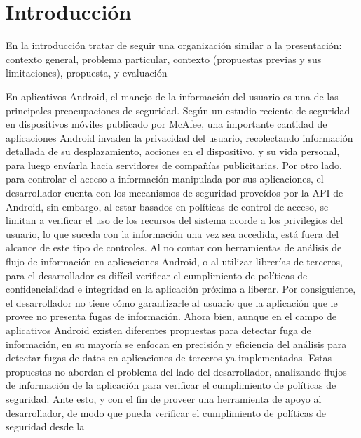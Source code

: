 \label{ch:introduccion}
\chapter{Introducción}
En la introducción tratar de seguir una organización similar a la presentación:
contexto general, problema particular, contexto (propuestas previas y sus
limitaciones), propuesta, y evaluación\newline

En aplicativos Android, el manejo de la información del usuario es una de las
principales preocupaciones de seguridad. Según un estudio reciente de seguridad
en dispositivos móviles publicado por McAfee\cite{McAfeeReport}, una importante
cantidad de aplicaciones Android invaden la privacidad del usuario, recolectando
información detallada de su desplazamiento, acciones en el dispositivo, y su
vida personal, para luego envíarla hacia servidores de compañías publicitarias.\newline 
Por otro lado, para controlar el acceso a información manipulada por sus
aplicaciones, el desarrollador cuenta con los mecanismos de seguridad proveídos
por la API de Android, sin embargo, al estar basados en políticas de control de
acceso, se limitan a verificar el uso de los recursos del sistema acorde a los
privilegios del usuario, lo que suceda con la información una vez sea accedida,
está fuera del alcance de este tipo de controles.\newline 
Al no contar con herramientas
de análisis de flujo de información en aplicaciones Android, o al utilizar
librerías de terceros, para el desarrollador es difícil verificar el
cumplimiento de políticas de confidencialidad e integridad en la aplicación
próxima a liberar. Por consiguiente, el desarrollador no tiene cómo garantizarle
al usuario que la aplicación que le provee no presenta fugas de información.\newline 
Ahora bien, aunque en el campo de aplicativos Android existen diferentes
propuestas para detectar fuga de información, en su mayoría  se enfocan en
precisión y eficiencia del análisis para detectar fugas de datos en aplicaciones
de terceros ya implementadas. Estas propuestas no abordan el problema del lado
del desarrollador, analizando flujos de información de la aplicación para
verificar el cumplimiento de políticas de seguridad.\newline
Ante esto, y con el fin de proveer una herramienta de apoyo al desarrollador, de
modo que pueda verificar el cumplimiento de políticas de seguridad desde la
